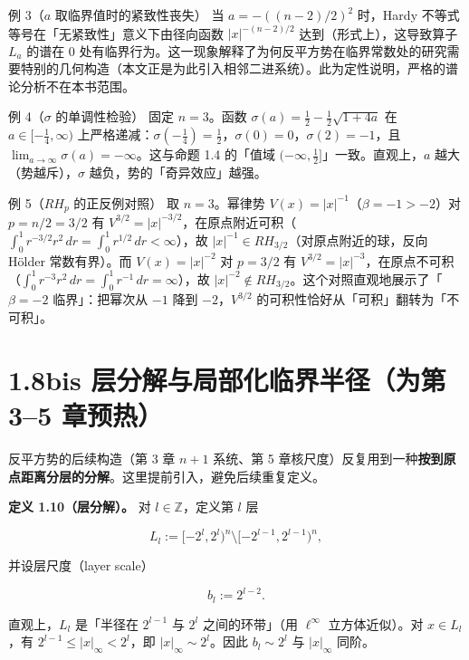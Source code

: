 \documentclass[a4paper,11pt,openany]{ctexbook}
\numberwithin{equation}{chapter}
\numberwithin{figure}{chapter}
\numberwithin{table}{chapter}
\begin{document}
\begin{examplebox}{例 3（$a$ 取临界值时的紧致性丧失）}
当 $a=-((n-2)/2)^2$ 时，Hardy 不等式等号在「无紧致性」意义下由径向函数 $|x|^{-(n-2)/2}$ 达到（形式上），这导致算子 $L_a$ 的谱在 $0$ 处有临界行为。这一现象解释了为何反平方势在临界常数处的研究需要特别的几何构造（本文正是为此引入相邻二进系统）。此为定性说明，严格的谱论分析不在本书范围。
\end{examplebox}

\begin{examplebox}{例 4（$\sigma$ 的单调性检验）}
固定 $n=3$。函数 $\sigma(a)=\frac12-\frac12\sqrt{1+4a}$ 在 $a\in[-\frac14,\infty)$ 上严格递减：$\sigma(-\frac14)=\frac12$，$\sigma(0)=0$，$\sigma(2)=-1$，且 $\lim_{a\to\infty}\sigma(a)=-\infty$。这与命题 1.4 的「值域 $(-\infty,\frac12]$」一致。直观上，$a$ 越大（势越斥），$\sigma$ 越负，势的「奇异效应」越强。
\end{examplebox}

\begin{examplebox}{例 5（$RH_p$ 的正反例对照）}
取 $n=3$。幂律势 $V(x)=|x|^{-1}$（$\beta=-1>-2$）对 $p=n/2=3/2$ 有 $V^{3/2}=|x|^{-3/2}$，在原点附近可积（$\int_0^1 r^{-3/2}r^2\,dr=\int_0^1 r^{1/2}\,dr<\infty$），故 $|x|^{-1}\in RH_{3/2}$（对原点附近的球，反向 Hölder 常数有界）。而 $V(x)=|x|^{-2}$ 对 $p=3/2$ 有 $V^{3/2}=|x|^{-3}$，在原点不可积（$\int_0^1 r^{-3}r^2\,dr=\int_0^1 r^{-1}\,dr=\infty$），故 $|x|^{-2}\notin RH_{3/2}$。这个对照直观地展示了「$\beta=-2$ 临界」：把幂次从 $-1$ 降到 $-2$，$V^{3/2}$ 的可积性恰好从「可积」翻转为「不可积」。
\end{examplebox}

\section{1.8bis 层分解与局部化临界半径（为第 3–5 章预热）}

反平方势的后续构造（第 3 章 $n+1$ 系统、第 5 章核尺度）反复用到一种\textbf{按到原点距离分层的分解}。这里提前引入，避免后续重复定义。

\textbf{定义 1.10（层分解）。} 对 $l\in\mathbb Z$，定义第 $l$ 层

$$L_l := [-2^l,2^l)^n \setminus [-2^{l-1},2^{l-1})^n,$$

并设层尺度（layer scale）

$$b_l := 2^{l-2}.$$

直观上，$L_l$ 是「半径在 $2^{l-1}$ 与 $2^l$ 之间的环带」（用 $\ell^\infty$ 立方体近似）。对 $x\in L_l$，有 $2^{l-1}\le |x|_\infty<2^l$，即 $|x|_\infty\sim 2^l$。因此 $b_l\sim 2^l$ 与 $|x|_\infty$ 同阶。
\end{document}
